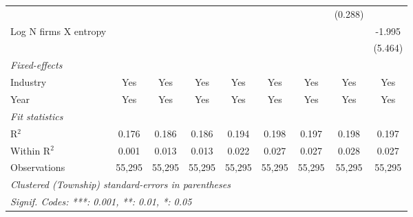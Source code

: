\begin{tabular}{lcccccccc}
                                                         &                &                 &                 &                  &                 &                 & (0.288)         &   \\   
   Log N firms X entropy                                 &                &                 &                 &                  &                 &                 &                 & -1.995\\   
                                                         &                &                 &                 &                  &                 &                 &                 & (5.464)\\   
   \midrule
   \emph{Fixed-effects}\\
   Industry                                              & Yes            & Yes             & Yes             & Yes              & Yes             & Yes             & Yes             & Yes\\  
   Year                                                  & Yes            & Yes             & Yes             & Yes              & Yes             & Yes             & Yes             & Yes\\  
   \midrule
   \emph{Fit statistics}\\
   R$^2$                                                 & 0.176          & 0.186           & 0.186           & 0.194            & 0.198           & 0.197           & 0.198           & 0.197\\  
   Within R$^2$                                          & 0.001          & 0.013           & 0.013           & 0.022            & 0.027           & 0.027           & 0.028           & 0.027\\  
   Observations                                          & 55,295         & 55,295          & 55,295          & 55,295           & 55,295          & 55,295          & 55,295          & 55,295\\  
   \midrule \midrule
   \multicolumn{9}{l}{\emph{Clustered (Township) standard-errors in parentheses}}\\
   \multicolumn{9}{l}{\emph{Signif. Codes: ***: 0.001, **: 0.01, *: 0.05}}\\
\end{tabular}
\par\endgroup
